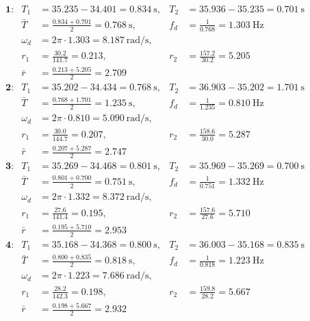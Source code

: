\documentclass[11pt,a4paper]{article}
\begin{document}
\begin{align*}
&\textbf{1:} & T_1 &= 35.235-34.401 = 0.834~\text{s}, & T_2 &= 35.936-35.235 = 0.701~\text{s} \\
& & \bar{T} &= \frac{0.834+0.701}{2} = 0.768~\text{s}, & f_d &= \frac{1}{0.768} = 1.303~\text{Hz} \\
& & \omega_d &= 2\pi \cdot 1.303 = 8.187~\text{rad/s}, & & \\
& & r_1 &= \frac{30.2}{141.7} = 0.213, & r_2 &= \frac{157.2}{30.2} = 5.205 \\
& & \bar{r} &= \frac{0.213+5.205}{2} = 2.709 & & \\[6pt]
&\textbf{2:} & T_1 &= 35.202-34.434 = 0.768~\text{s}, & T_2 &= 36.903-35.202 = 1.701~\text{s} \\
& & \bar{T} &= \frac{0.768+1.701}{2} = 1.235~\text{s}, & f_d &= \frac{1}{1.235} = 0.810~\text{Hz} \\
& & \omega_d &= 2\pi \cdot 0.810 = 5.090~\text{rad/s}, & & \\
& & r_1 &= \frac{30.0}{144.7} = 0.207, & r_2 &= \frac{158.6}{30.0} = 5.287 \\
& & \bar{r} &= \frac{0.207+5.287}{2} = 2.747 & & \\[6pt]
&\textbf{3:} & T_1 &= 35.269-34.468 = 0.801~\text{s}, & T_2 &= 35.969-35.269 = 0.700~\text{s} \\
& & \bar{T} &= \frac{0.801+0.700}{2} = 0.751~\text{s}, & f_d &= \frac{1}{0.751} = 1.332~\text{Hz} \\
& & \omega_d &= 2\pi \cdot 1.332 = 8.372~\text{rad/s}, & & \\
& & r_1 &= \frac{27.6}{141.4} = 0.195, & r_2 &= \frac{157.6}{27.6} = 5.710 \\
& & \bar{r} &= \frac{0.195+5.710}{2} = 2.953 & & \\[6pt]
&\textbf{4:} & T_1 &= 35.168-34.368 = 0.800~\text{s}, & T_2 &= 36.003-35.168 = 0.835~\text{s} \\
& & \bar{T} &= \frac{0.800+0.835}{2} = 0.818~\text{s}, & f_d &= \frac{1}{0.818} = 1.223~\text{Hz} \\
& & \omega_d &= 2\pi \cdot 1.223 = 7.686~\text{rad/s}, & & \\
& & r_1 &= \frac{28.2}{142.3} = 0.198, & r_2 &= \frac{159.8}{28.2} = 5.667 \\
& & \bar{r} &= \frac{0.198+5.667}{2} = 2.932 & &
\end{align*}
\end{document}
